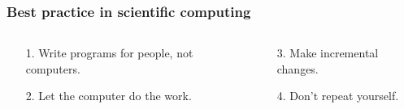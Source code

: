 \documentclass{beamer}
\begin{document}
\begin{frame}[t]
    \frametitle{Best practice in scientific computing}
    \begin{columns}
        \begin{column}{.23\linewidth}
            \begin{block}{}
                \begin{minipage}[t][\blockheight][t]{\linewidth}
                    \begin{enumerate}
                        \item[1.] Write programs for people, not computers.
                    \end{enumerate}
                \end{minipage}
            \end{block}
            \begin{block}{}
                \begin{minipage}[t][\blockheight][t]{\linewidth}
                    \begin{enumerate}
                        \item[2.] Let the computer do the work.
                    \end{enumerate}
                \end{minipage}
            \end{block}
        \end{column}
        \begin{column}{.23\linewidth}
            \begin{block}{}
                \begin{minipage}[t][\blockheight][t]{\linewidth}
                    \begin{enumerate}
                        \item[3.] Make incremental changes.
                    \end{enumerate}
                \end{minipage}
            \end{block}
            \begin{block}{}
                \begin{minipage}[t][\blockheight][t]{\linewidth}
                    \begin{enumerate}
                        \item[4.] Don't repeat yourself.

\end{enumerate}
\end{minipage}
\end{block}
\end{column}
\end{columns}
\end{frame}
\end{document}
